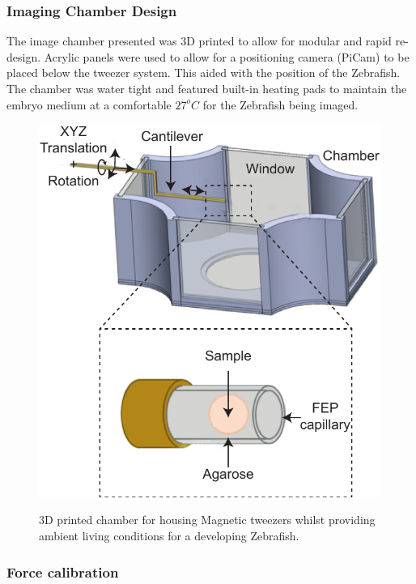 \subsubsection{Imaging Chamber Design}

The image chamber presented was 3D printed to allow for modular and rapid re-design.
Acrylic panels were used to allow for a positioning camera (PiCam) to be placed below the tweezer system.
This aided with the position of the Zebrafish.
The chamber was water tight and featured built-in heating pads to maintain the embryo medium at a comfortable $27^oC$ for the Zebrafish being imaged.

\begin{figure}
  \centering
  \includegraphics{Chapters/tweezers/Figs/PDF/fep_chamber}
  \label{fig:fep_chamber}
  \caption{3D printed chamber for housing Magnetic tweezers whilst providing ambient living conditions for a developing Zebrafish.}
\end{figure}

\subsubsection{Force calibration}

